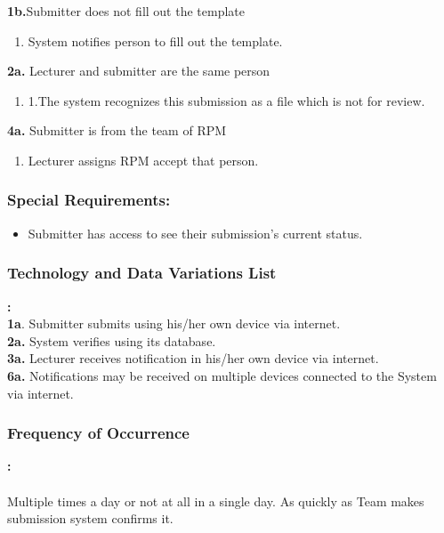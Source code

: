     
  \textbf{1b.}Submitter does not fill out the template
     \begin{enumerate}
         \itemsep-1em 
        \item System notifies person to fill out the template.
    \end{enumerate}
    
    
   \textbf{ 2a.} Lecturer and submitter are the same person
    
    \begin{enumerate}
         \itemsep-1em 
        \item 1.The system recognizes this submission as a file which is not for review.
    \end{enumerate}
    
    
    \textbf{4a.} Submitter is from the team of RPM
    
    \begin{enumerate}
         \itemsep-1em 
        \item Lecturer assigns RPM accept that person.
    \end{enumerate}
    
    


\subsubsection*{Special Requirements:}
    \begin{itemize}
    \itemsep-1em 
       \item Submitter has access to see their submission’s current status.
    \end{itemize}
     

     \subsubsection*{Technology and Data Variations List}\textbf{:}
     \\
    \textbf{ 1a}. Submitter submits using his/her own device via internet.
     \\
     \textbf{2a.} System verifies using its database.
     \\
     \textbf{3a.} Lecturer receives notification in his/her own device via internet.
     \\
     \textbf{6a.} Notifications may be received on multiple devices connected to the System via internet.
     
     \subsubsection*{Frequency of Occurrence}\textbf{:}
     \\
     \\
     Multiple times a day or not at all in a single day. As quickly as Team makes submission system confirms it.
     
